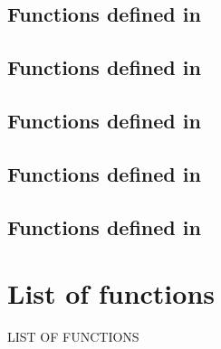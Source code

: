 \documentclass[english,a4paper,11pt,oldtoc,mctitle]{rapport3}
\begin{document}
\section{Functions defined in }
\label{sec:queryref}


\section{Functions defined in }
\label{sec:menuref}


\section{Functions defined in }
\label{sec:dockref}


\section{Functions defined in }
\label{sec:spref}


\section{Functions defined in }
\label{sec:deref}


\appendix



\chapter*{List of functions}
%
         {\MakeUppercase{List of functions}}%

\makeatletter
\def\fnlisti#1{\@dottedtocline{1}{0em}{1.5em}{\lstinline!#1!}{\pageref{fn:#1}}}
{\parskip\z@}
\makeatother

\begin{htmlonly}
\newcommand{\fnlisti}[1]{\fnref{#1}\\}

\end{htmlonly}


\printindex
\end{document}
